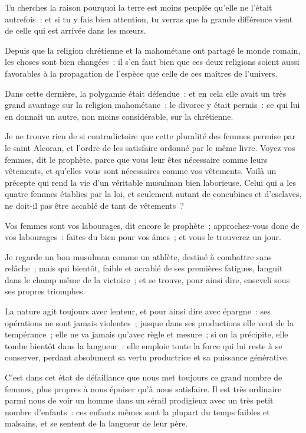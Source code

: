 \documentclass[french,twoside]{book} %
\begin{document}
\noindent Tu cherches la raison pourquoi la terre est moins peuplée qu’elle ne l’était autrefois : et si tu y fais bien attention, tu verras que la grande différence vient de celle qui est arrivée dans les mœurs.\par
Depuis que la religion chrétienne et la mahométane ont partagé le monde romain, les choses sont bien changées : il s’en faut bien que ces deux religions soient aussi favorables à la propagation de l’espèce que celle de ces maîtres de l’univers.\par
Dans cette dernière, la polygamie était défendue : et en cela elle avait un très grand avantage sur la religion mahométane ; le divorce y était permis : ce qui lui en donnait un autre, non moins considérable, sur la chrétienne.\par
Je ne trouve rien de si contradictoire que cette pluralité des femmes permise par le saint Alcoran, et l’ordre de les satisfaire ordonné par le même livre. Voyez vos femmes, dit le prophète, parce que vous leur êtes nécessaire comme leurs vêtements, et qu’elles vous sont nécessaires comme vos vêtements. Voilà un précepte qui rend la vie d’un véritable musulman bien laborieuse. Celui qui a les quatre femmes établies par la loi, et seulement autant de concubines et d’esclaves, ne doit-il pas être accablé de tant de vêtements ?\par
Vos femmes sont vos labourages, dit encore le prophète ; approchez-vous donc de vos labourages : faites du bien pour vos âmes ; et vous le trouverez un jour.\par
Je regarde un bon musulman comme un athlète, destiné à combattre sans relâche ; mais qui bientôt, faible et accablé de ses premières fatigues, languit dans le champ même de la victoire ; et se trouve, pour ainsi dire, enseveli sous ses propres triomphes.\par
La nature agit toujours avec lenteur, et pour ainsi dire avec épargne : ses opérations ne sont jamais violentes ; jusque dans ses productions elle veut de la tempérance ; elle ne va jamais qu’avec règle et mesure ; si on la précipite, elle tombe bientôt dans la langueur : elle emploie toute la force qui lui reste à se conserver, perdant absolument sa vertu productrice et sa puissance générative.\par
C’est dans cet état de défaillance que nous met toujours ce grand nombre de femmes, plus propres à nous épuiser qu’à nous satisfaire. Il est très ordinaire parmi nous de voir un homme dans un sérail prodigieux avec un très petit nombre d’enfants : ces enfants mêmes sont la plupart du temps faibles et malsains, et se sentent de la langueur de leur père.\par
\end{document}
